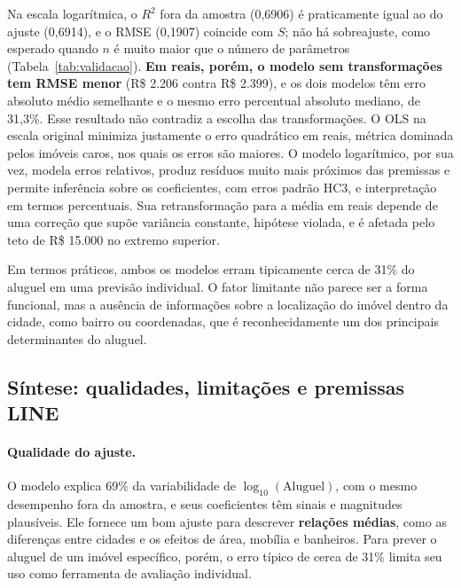 \documentclass[12pt,a4paper]{article}
\newcommand{\Rtwo}{\ensuremath{R^2}}
\begin{document}
\begin{table}[H]
\centering
\caption{Desempenho preditivo por validação cruzada em dez partes (previsões sempre fora da amostra de ajuste).}
\label{tab:validacao}
\small

\end{table}

Na escala logarítmica, o \Rtwo{} fora da amostra (0,6906) é praticamente igual ao do ajuste (0,6914), e o RMSE (0,1907) coincide com $S$; não há sobreajuste, como esperado quando $n$ é muito maior que o número de parâmetros (Tabela~\ref{tab:validacao}). \textbf{Em reais, porém, o modelo sem transformações tem RMSE menor} (R\$ 2.206 contra R\$ 2.399), e os dois modelos têm erro absoluto médio semelhante e o mesmo erro percentual absoluto mediano, de 31,3\%. Esse resultado não contradiz a escolha das transformações. O OLS na escala original minimiza justamente o erro quadrático em reais, métrica dominada pelos imóveis caros, nos quais os erros são maiores. O modelo logarítmico, por sua vez, modela erros relativos, produz resíduos muito mais próximos das premissas e permite inferência sobre os coeficientes, com erros padrão HC3, e interpretação em termos percentuais. Sua retransformação para a média em reais depende de uma correção que supõe variância constante, hipótese violada, e é afetada pelo teto de R\$ 15.000 no extremo superior.

Em termos práticos, ambos os modelos erram tipicamente cerca de 31\% do aluguel em uma previsão individual. O fator limitante não parece ser a forma funcional, mas a ausência de informações sobre a localização do imóvel dentro da cidade, como bairro ou coordenadas, que é reconhecidamente um dos principais determinantes do aluguel.

\subsection{Síntese: qualidades, limitações e premissas LINE}

\paragraph{Qualidade do ajuste.} O modelo explica 69\% da variabilidade de $\log_{10}(\text{Aluguel})$, com o mesmo desempenho fora da amostra, e seus coeficientes têm sinais e magnitudes plausíveis. Ele fornece um bom ajuste para descrever \textbf{relações médias}, como as diferenças entre cidades e os efeitos de área, mobília e banheiros. Para prever o aluguel de um imóvel específico, porém, o erro típico de cerca de 31\% limita seu uso como ferramenta de avaliação individual.
\end{document}
